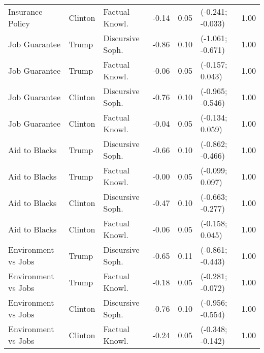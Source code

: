 \begin{table}[ht]
\begin{tabular}{lllrrlr}
  Insurance Policy & Clinton & Factual Knowl. & -0.14 & 0.05 & (-0.241; -0.033) & 1.00 \\ 
  Job Guarantee & Trump & Discursive Soph. & -0.86 & 0.10 & (-1.061; -0.671) & 1.00 \\ 
  Job Guarantee & Trump & Factual Knowl. & -0.06 & 0.05 & (-0.157; 0.043) & 1.00 \\ 
  Job Guarantee & Clinton & Discursive Soph. & -0.76 & 0.10 & (-0.965; -0.546) & 1.00 \\ 
  Job Guarantee & Clinton & Factual Knowl. & -0.04 & 0.05 & (-0.134; 0.059) & 1.00 \\ 
  Aid to Blacks & Trump & Discursive Soph. & -0.66 & 0.10 & (-0.862; -0.466) & 1.00 \\ 
  Aid to Blacks & Trump & Factual Knowl. & -0.00 & 0.05 & (-0.099; 0.097) & 1.00 \\ 
  Aid to Blacks & Clinton & Discursive Soph. & -0.47 & 0.10 & (-0.663; -0.277) & 1.00 \\ 
  Aid to Blacks & Clinton & Factual Knowl. & -0.06 & 0.05 & (-0.158; 0.045) & 1.00 \\ 
  Environment vs Jobs & Trump & Discursive Soph. & -0.65 & 0.11 & (-0.861; -0.443) & 1.00 \\ 
  Environment vs Jobs & Trump & Factual Knowl. & -0.18 & 0.05 & (-0.281; -0.072) & 1.00 \\ 
  Environment vs Jobs & Clinton & Discursive Soph. & -0.76 & 0.10 & (-0.956; -0.554) & 1.00 \\ 
  Environment vs Jobs & Clinton & Factual Knowl. & -0.24 & 0.05 & (-0.348; -0.142) & 1.00 \\ 
   \hline
\end{tabular}
\end{table}
